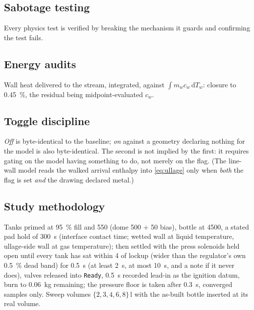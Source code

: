 \documentclass[11pt,a4paper]{article}
\newcommand{\code}[1]{\texttt{#1}}
\begin{document}
\subsection{Sabotage testing}
Every physics test is verified by breaking the mechanism it guards and
confirming the test fails.

\subsection{Energy audits}
Wall heat delivered to the stream, integrated, against $\int m_wc_w\,\mathrm{d}T_w$:
closure to \SI{0.45}{\percent}, the residual being midpoint-evaluated $c_w$.

\subsection{Toggle discipline}\label{sec:toggle}
\emph{Off} is byte-identical to the baseline; \emph{on} against a geometry
declaring nothing for the model is also byte-identical. The second is not
implied by the first: it requires gating on the model having something to do,
not merely on the flag. (The line-wall model reads the walked arrival enthalpy
into \cref{eq:ullage} only when \emph{both} the flag is set \emph{and} the
drawing declared metal.)

\subsection{Study methodology}
Tanks primed at \SI{95}{\percent} fill and \SI{550}{\psig} (dome \SI{500}{\psig}
$+$ \SI{50}{\psi} bias), bottle at \SI{4500}{\psig}, a stated pad hold of
\SI{300}{\second} (interface contact time; wetted wall at liquid temperature,
ullage-side wall at gas temperature); then settled with the press solenoids
held open until every tank has sat within \SI{4}{\psi} of lockup (wider than the regulator's own \SI{0.5}{\percent} dead band) for
\SI{0.5}{\second} (at least \SI{2}{\second}, at most \SI{10}{\second}, and a
note if it never does), valves released into \code{Ready}, \SI{0.5}{\second}
recorded lead-in as the ignition datum, burn to \SI{0.06}{\kilogram} remaining; the pressure floor is
taken after \SI{0.3}{\second}, converged samples only. Sweep volumes
$\{2,3,4,6,8\}\,\si{\litre}$ with the as-built bottle inserted at its real
volume.
\end{document}
